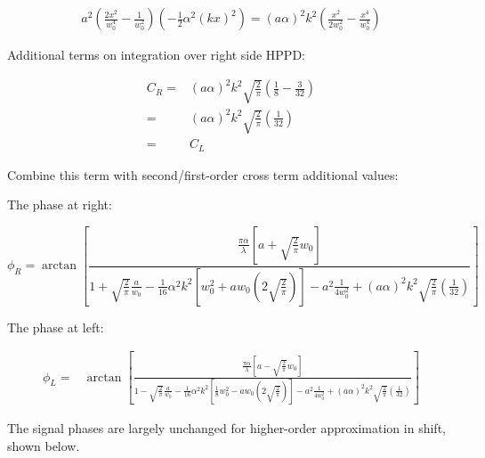 \documentclass[aps,twoside,secnumarabic,balancelastpage,amsmath,amssymb,nofootinbib,hyperref=pdftex]{revtex4}
\begin{document}
\begin{align*}
		a^2
		(
			\frac{2x^2}{w_0^4}
			-
			\frac{1}{w_0^2} 
		)
		(	
                - \frac{1}{2}\alpha^2 (kx)^2 
		)
		=
		(a \alpha)^2 k^2
		(
		\frac{x^2}{2 w_0^2}
		-
		\frac{x^4}{w_0^4}
		)
\end{align*}

Additional terms on integration over right side HPPD:

\begin{align*}
C_R=&
		(a \alpha)^2 k^2
		\sqrt{\frac{2}{\pi}}
		(
		\frac{1}{8 }
		-
		\frac{3}{32}
		)
		\\=&
		(a \alpha)^2 k^2
		\sqrt{\frac{2}{\pi}}
		(
		\frac{1}{32}
		)	
		\\=&
		C_L	
\end{align*}

Combine this term with second/first-order cross term additional values:

The phase at right:

\begin{equation*}
	\phi_R = 		
			\arctan
				\left[
					\frac
					{ \frac{\pi \alpha}{\lambda}
					\left[
						a 
						+
						\sqrt{\frac{2}{\pi}} w_0
					\right]}					
				{1
				+
				 \sqrt{\frac{2}{\pi}} \frac{a}{w_0}
				 		-\frac{1}{16}\alpha^2 k^2 
	[
	 w_0^2
	+ 
	a w_0(
		2
	\sqrt{\frac{2}{\pi}}
	)
	]			
		-
	a^2 \frac{1}{4 w_0^2} 
	+
			(a \alpha)^2 k^2
		\sqrt{\frac{2}{\pi}}
		(
		\frac{1}{32}
		)	
				 }
				\right]
\end{equation*}

The phase at left:

\begin{align*}
	\phi_L =&
			\arctan
				\left[
					\frac
					{ \frac{\pi \alpha}{\lambda}
					\left[
						a 
						-
						\sqrt{\frac{2}{\pi}} w_0
					\right]}					
				{1
				-
				 \sqrt{\frac{2}{\pi}} \frac{a}{w_0}
	-\frac{1}{16}
	\alpha^2 k^2 
	[
	 \frac{1}{8} w_0^2
	- 
	a w_0(
	2
	\sqrt{\frac{2}{\pi}}
	)
	]		
	-
	a^2 \frac{1}{4 w_0^2}	
		+
			(a \alpha)^2 k^2
		\sqrt{\frac{2}{\pi}}
		(
		\frac{1}{32}
		)	 
				 }
				\right]
\end{align*}

\clearpage

The signal phases are largely unchanged for higher-order approximation in shift, shown below.
\end{document}
